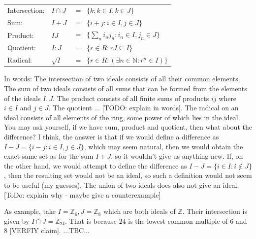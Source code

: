 \medskip
\begin{tabular}{l l l}
Intersection:  & $I \cap J$& $ = \;\; \{k : k \in I, k \in J\}$  \\
Sum:           & $I + J$   & $ = \;\; \{i + j : i \in I, j \in J\}$  \\
Product:       & $I J$     & $ = \;\; \{\sum_n i_n j_n : i_n \in I, j_n \in J\}$  \\
Quotient:      & $I:J$     & $ = \;\;  \{r \in R : r J \subseteq I\}$  \\
Radical:       & $\sqrt{I}$& $ = \;\; \{ r \in R : (\exists n \in \mathbb{N} :  r^n \in I) \}$  \\
\end{tabular}
\medskip

In words: The intersection of two ideals consists of all their common elements. The sum of two ideals consists of all sums that can be formed from the elements of the ideals $I,J$. The product consists of all finite sums of products $i j$ where $i \in I$ and $j \in J$. The quotient ... [TODO: explain in words]. The radical on an ideal consists of all elements of the ring, some power of which lies in the ideal. You may ask yourself, if we have sum, product and quotient, then what about the difference? I think, the answer is that if we would define a difference as $I - J = \{i - j : i \in I, j \in J\}$, which may seem natural, then we would obtain the exact same set as for the sum $I + J$, so it wouldn't give us anything new. If, on the other hand, we would attempt to define the difference as $I - J = \{i \in I : i \notin J\}$, then the resulting set would not be an ideal, so such a definition would not seem to be useful (my guesses). The union of two ideals does also not give an ideal. [ToDo: explain why - maybe give a counterexample]





\medskip
As example, take $I = \mathbb{Z}_6, J = \mathbb{Z}_8$ which are both ideals of $\mathbb{Z}$. Their intersection is given by $I \cap J = \mathbb{Z}_{24}$. That is because $24$ is the lowest common multiple of $6$ and $8$ [VERFIY claim]. ...TBC...

